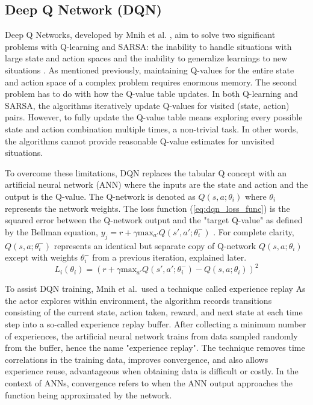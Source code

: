 \subsection{Deep Q Network (DQN)}
Deep Q Networks, developed by Mnih et al. \cite{Mnih_2015}, aim to solve two significant problems with Q-learning and SARSA: the inability to handle situations with large state and action spaces and the inability to generalize learnings to new situations \cite{sutton_policygrad}. As mentioned previously, maintaining Q-values for the entire state and action space of a complex problem requires enormous memory. The second problem has to do with how the Q-value table updates. In both Q-learning and SARSA, the algorithms iteratively update Q-values for visited (state, action) pairs. However, to fully update the Q-value table means exploring every possible state and action combination multiple times, a non-trivial task. In other words, the algorithms cannot provide reasonable Q-value estimates for unvisited situations.

To overcome these limitations, DQN replaces the tabular Q concept with an artificial neural network (ANN) where the inputs are the state and action and the output is the Q-value. The Q-network is denoted as $Q(s,a;\theta_i)$ where $\theta_i$ represents the network weights. The loss function (\ref{eq:dqn_loss_func}) is the squared error between the Q-network output and the "target Q-value" as defined by the Bellman equation, $y_j = r + \gamma \text{max}_{a'}Q(s', a';\theta^-_i)$  \cite{Mnih_2015}. For complete clarity, $Q(s,a;\theta^-_i)$ represents an identical but separate copy of Q-network $Q(s,a;\theta_i)$ except with weights $\theta^-_i$ from a previous iteration, explained later.
\begin{equation}
	\label{eq:dqn_loss_func}
L_i(\theta_i) = (r + \gamma \text{max}_{a'}Q(s', a';\theta^-_i)-Q(s,a;\theta_i))^2
\end{equation}

To assist DQN training, Mnih et al.\ used a technique called experience replay \cite{Mnih_2015} As the actor explores within environment, the algorithm records transitions consisting of the current state, action taken, reward, and next state at each time step into a so-called experience replay buffer. After collecting a minimum number of experiences, the artificial neural network trains from data sampled randomly from the buffer, hence the name "experience replay". The technique removes time correlations in the training data, improves convergence, and also allows experience reuse, advantageous when obtaining data is difficult or costly. In the context of ANNs, convergence refers to when the ANN output approaches the function being approximated by the network.

